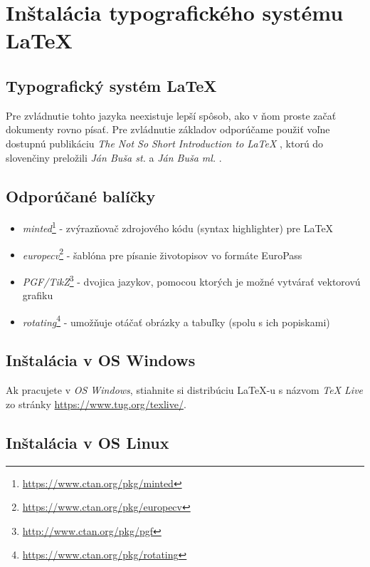 \chapter{Inštalácia typografického systému\\ \LaTeX}
\label{ch:instalacia}

\section{Typografický systém \LaTeX}

Pre zvládnutie tohto jazyka neexistuje lepší spôsob, ako v ňom proste začať dokumenty rovno písať. Pre zvládnutie základov odporúčame použiť voľne dostupnú publikáciu \emph{The Not So Short Introduction to \LaTeX} \cite{lshort}, ktorú do slovenčiny preložili \emph{Ján Buša st.} a \emph{Ján Buša ml.} \cite{lshortsk}.

\section{Odporúčané balíčky}
\begin{itemize}
    \item \emph{minted}\footnote{\url{https://www.ctan.org/pkg/minted}} - zvýrazňovač zdrojového kódu (syntax highlighter) pre \LaTeX 
    \item \emph{europecv}\footnote{\url{https://www.ctan.org/pkg/europecv}} - šablóna pre písanie životopisov vo formáte EuroPass 
    \item \emph{PGF/TikZ}\footnote{\url{http://www.ctan.org/pkg/pgf}} - dvojica jazykov, pomocou ktorých je možné vytvárať vektorovú grafiku 
    \item \emph{rotating}\footnote{\url{https://www.ctan.org/pkg/rotating}} - umožňuje otáčať obrázky a tabuľky (spolu s ich popiskami)
\end{itemize}

\section{Inštalácia v OS Windows}

Ak pracujete v \emph{OS Windows}, stiahnite si distribúciu \LaTeX-u s názvom \emph{TeX Live} zo stránky \url{https://www.tug.org/texlive/}.

\section{Inštalácia v OS Linux}

